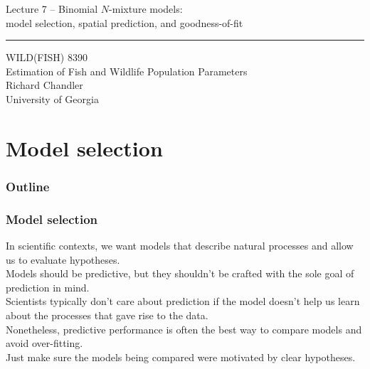 \documentclass[color=usenames,dvipsnames]{beamer}\usepackage[]{graphicx}\usepackage[]{color}
\begin{document}
\begin{frame}[plain]
  \LARGE
  \centering
  {\LARGE Lecture 7 -- Binomial $N$-mixture models: \\
    model selection, spatial prediction, and goodness-of-fit} \\  
  {\color{default} \rule{\textwidth}{0.1pt}}
  \vfill
  \large
  WILD(FISH) 8390 \\
  Estimation of Fish and Wildlife Population Parameters \\
  \vfill
  \large
  Richard Chandler \\
  University of Georgia \\
\end{frame}





\section{Model selection}



\begin{frame}[plain]
  \frametitle{Outline}
  \Large
\end{frame}





\begin{frame}
  \frametitle{Model selection}
  In scientific contexts, we want models that describe natural
  processes and allow us to evaluate hypotheses. \\
  \pause
  \vfill
  Models should be predictive, but they shouldn't be crafted with the
  sole goal of prediction in mind. \\
  \pause
  \vfill
  Scientists typically don't care about prediction if the model
  doesn't help us learn about the processes that gave rise to the
  data. \\  
  \pause
  \vfill
  Nonetheless, predictive performance is often the best way
  to compare models and avoid over-fitting. \\
  \pause
  \vfill
  Just make sure the models being compared were motivated by clear
  hypotheses.
\end{frame}
\end{document}
